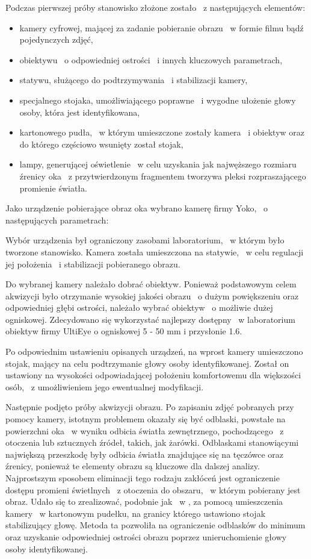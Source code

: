 Podczas pierwszej próby stanowisko złożone zostało ~z następujących elementów:
\begin{itemize}
 \item kamery cyfrowej, mającej za zadanie pobieranie obrazu ~w formie filmu bądź pojedynczych zdjęć,
 \item obiektywu ~o odpowiedniej ostrości ~i innych kluczowych parametrach,
 \item statywu, służącego do podtrzymywania ~i stabilizacji kamery,
 \item specjalnego stojaka, umożliwiającego poprawne ~i wygodne ułożenie głowy osoby, która jest identyfikowana,
 \item kartonowego pudła, ~w którym umieszczone zostały kamera ~i obiektyw oraz do którego częściowo wsunięty został stojak,
 \item lampy, generującej oświetlenie ~w celu uzyskania jak najwęższego rozmiaru źrenicy oka ~z przytwierdzonym fragmentem tworzywa pleksi rozpraszającego promienie światła.
 \end{itemize}

Jako urządzenie pobierające obraz oka wybrano kamerę firmy Yoko, ~o następujących parametrach:

Wybór urządzenia był ograniczony zasobami laboratorium, ~w którym było tworzone stanowisko. Kamera została umieszczona na statywie, ~w celu regulacji jej położenia ~i stabilizacji pobieranego obrazu.

Do wybranej kamery należało dobrać obiektyw. Ponieważ podstawowym celem akwizycji było otrzymanie wysokiej jakości obrazu ~o dużym powiększeniu oraz odpowiedniej głębi ostrości, należało wybrać obiektyw ~o możliwie dużej ogniskowej. Zdecydowano się wykorzystać najlepszy dostępny ~w laboratorium obiektyw firmy UltiEye o ogniskowej 5 - 50 mm i przysłonie 1.6.

Po odpowiednim ustawieniu opisanych urządzeń, na wprost kamery umieszczono stojak, mający na celu podtrzymanie głowy osoby identyfikowanej. Został on ustawiony na wysokości odpowiadającej położeniu komfortowemu dla większości osób, ~z umożliwieniem jego ewentualnej modyfikacji.

Następnie podjęto próby akwizycji obrazu. Po zapisaniu zdjęć pobranych przy pomocy kamery, istotnym problemem okazały się być odblaski, powstałe na powierzchni oka ~w wyniku odbicia światła zewnętrznego, pochodzącego ~z otoczenia lub sztucznych źródeł, takich, jak żarówki. Odblaskami stanowiącymi największą przeszkodę były odbicia światła znajdujące się na tęczówce oraz źrenicy, ponieważ te elementy obrazu są kluczowe dla dalszej analizy. Najprostszym sposobem eliminacji tego rodzaju zakłóceń jest ograniczenie dostępu promieni świetlnych ~z otoczenia do obszaru, ~w którym pobierany jest obraz. Udało się to zrealizować, podobnie jak ~w \cite{Gl11}, za pomocą umieszczenia kamery ~w kartonowym pudełku, na granicy którego ustawiono stojak stabilizujący głowę. Metoda ta pozwoliła na ograniczenie odblasków do minimum oraz uzyskanie odpowiedniej ostrości obrazu poprzez unieruchomienie głowy osoby identyfikowanej.

